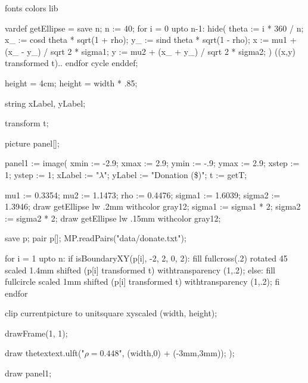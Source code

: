 \environment fonts
\environment colors
\environment lib

\startMPdefinitions
vardef getEllipse =
  save n; n := 40;
  for i = 0 upto n-1:
    hide(
      theta := i * 360 / n;
      x_ := cosd theta * sqrt(1 + rho);
      y_ := sind theta * sqrt(1 - rho);
      x := mu1 + (x_ - y_) / sqrt 2 * sigma1;
      y := mu2 + (x_ + y_) / sqrt 2 * sigma2;
    )
    ((x,y) transformed t)..
  endfor cycle
enddef;
\stopMPdefinitions

\startMPpage

height = 4cm;
height = width * .85;

string xLabel, yLabel;

transform t;

picture panel[];

panel1 := image(
  xmin := -2.9;
  xmax := 2.9;
  ymin := -.9;
  ymax := 2.9;
  xstep := 1;
  ystep := 1;
  xLabel := "$\lambda$";
  yLabel := "Donation (\$)";
  t := getT;



  mu1 := 0.3354;
  mu2 := 1.1473;
  rho := 0.4476;
  sigma1 := 1.6039;
  sigma2 := 1.3946;
  draw getEllipse lw .2mm withcolor gray12;
  sigma1 := sigma1 * 2;
  sigma2 := sigma2 * 2;
  draw getEllipse lw .15mm withcolor gray12;

  save p; pair p[];
  MP.readPairs("data/donate.txt");

  for i = 1 upto n:
    if isBoundaryXY(p[i], -2, 2, 0, 2):
      fill fullcross(.2) rotated 45 scaled 1.4mm shifted (p[i] transformed t) withtransparency (1,.2);
    else:
      fill fullcircle scaled 1mm shifted (p[i] transformed t) withtransparency (1,.2);
    fi
  endfor

  clip currentpicture to unitsquare xyscaled (width, height);

  drawFrame(1, 1);

  draw thetextext.ulft("$\rho=0.448$", (width,0) + (-3mm,3mm));
);

draw panel1;
\stopMPpage